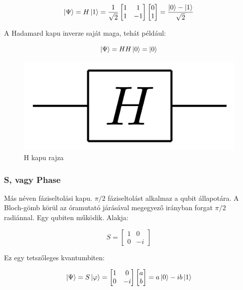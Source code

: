 \documentclass[
]{thesis-ekf}
\theoremstyle{definition}
\theoremstyle{remark}
\begin{document}
\begin{equation}
	\ket{\Psi}=H\ket{1}=\frac{1}{\sqrt{2}}
	\begin{bmatrix}
		1 & 1\\
		1 & -1
	\end{bmatrix}
	\begin{bmatrix}
		0\\
		1
	\end{bmatrix}=\frac{\ket{0}-\ket{1}}{\sqrt{2}}
\end{equation}

A Hadamard kapu inverze saját maga, tehát például:

\begin{equation}\label{hinverz}
	\ket{\Psi}=HH\ket{0}=\ket{0}
\end{equation}

\begin{figure}[H]
	\centering
	\includegraphics[width=0.3\linewidth]{Hadamard}
	\caption{H kapu rajza}
	\label{fig:hadamard}
\end{figure}


\subsubsection{S, vagy Phase}
Más néven fáziseltolási kapu. $\pi/2$ fáziseltolást alkalmaz a qubit állapotára. A Bloch-gömb körül az óramutató járásával megegyező irányban forgat $\pi/2$ radiánnal. Egy qubiten működik. Alakja:

\begin{equation}
	S= 
	\begin{bmatrix}
		1 & 0\\
		0 & -i
	\end{bmatrix}
\end{equation}

Ez egy tetszőleges kvantumbiten:

\begin{equation}
	\ket{\Psi}=S\ket{\varphi}=
	\begin{bmatrix}
		1 & 0\\
		0 & -i
	\end{bmatrix}
	\begin{bmatrix}
		a\\
		b
	\end{bmatrix}=a\ket{0}-ib\ket{1}
\end{equation}
\end{document}
